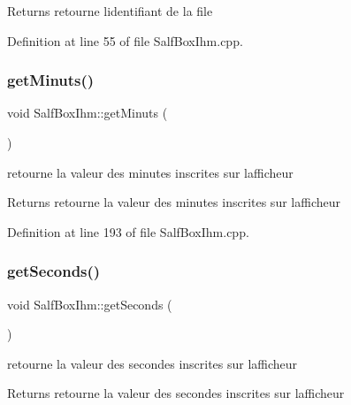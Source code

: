 \begin{DoxyReturn}{Returns}
retourne l\textquotesingle{}identifiant de la file 
\end{DoxyReturn}


Definition at line 55 of file Salf\+Box\+Ihm.\+cpp.

\mbox{\label{class_salf_box_ihm_a3ffe43dd9ae6a29f4d6bb7871ef3cf45}} 
\subsubsection{\texorpdfstring{get\+Minuts()}{getMinuts()}}
{\footnotesize\ttfamily void Salf\+Box\+Ihm\+::get\+Minuts (\begin{DoxyParamCaption}{ }\end{DoxyParamCaption})\hspace{0.3cm}{\ttfamily [static]}}



retourne la valeur des minutes inscrites sur l\textquotesingle{}afficheur 

\begin{DoxyReturn}{Returns}
retourne la valeur des minutes inscrites sur l\textquotesingle{}afficheur 
\end{DoxyReturn}


Definition at line 193 of file Salf\+Box\+Ihm.\+cpp.

\mbox{\label{class_salf_box_ihm_afb383d3a23e457fc57bcca36526801f1}} 
\subsubsection{\texorpdfstring{get\+Seconds()}{getSeconds()}}
{\footnotesize\ttfamily void Salf\+Box\+Ihm\+::get\+Seconds (\begin{DoxyParamCaption}{ }\end{DoxyParamCaption})\hspace{0.3cm}{\ttfamily [static]}}



retourne la valeur des secondes inscrites sur l\textquotesingle{}afficheur 

\begin{DoxyReturn}{Returns}
retourne la valeur des secondes inscrites sur l\textquotesingle{}afficheur 
\end{DoxyReturn}


